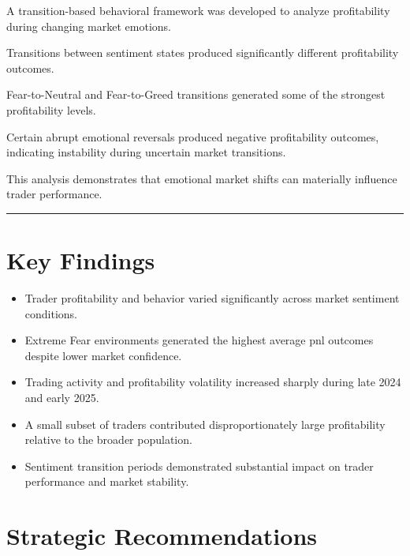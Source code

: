 \documentclass[11pt,a4paper]{article}
\begin{document}
A transition-based behavioral framework was developed to analyze profitability during changing market emotions.

Transitions between sentiment states produced significantly different profitability outcomes.

Fear-to-Neutral and Fear-to-Greed transitions generated some of the strongest profitability levels.

Certain abrupt emotional reversals produced negative profitability outcomes, indicating instability during uncertain market transitions.

This analysis demonstrates that emotional market shifts can materially influence trader performance.


\vspace{0.5cm}
\hrule
\vspace{0.3cm}

\section{Key Findings}

\begin{itemize}
    \item Trader profitability and behavior varied significantly across market sentiment conditions.

    \item Extreme Fear environments generated the highest average pnl outcomes despite lower market confidence.

    \item Trading activity and profitability volatility increased sharply during late 2024 and early 2025.

    \item A small subset of traders contributed disproportionately large profitability relative to the broader population.

    \item Sentiment transition periods demonstrated substantial impact on trader performance and market stability.
\end{itemize}


\section{Strategic Recommendations}
\end{document}

